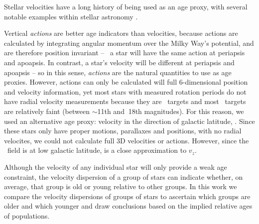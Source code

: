 Stellar velocities have a long history of being used as an age proxy, with
several notable examples within stellar astronomy \citep[\eg][]{faherty2009,
west2011}.

Vertical {\it actions} are better age indicators than velocities, because
actions are calculated by integrating angular momentum over the Milky Way's
potential, and are therefore position invariant -- \eg\ a star will have the
same action at periapsis and apoapsis.
In contrast, a star's velocity will be different at periapsis and apoapsis --
so in this sense, {\it actions} are the natural quantities to use as age
proxies.
However, actions can only be calculated will full 6-dimensional position and
velocity information, yet most stars with measured rotation periods do not
have radial velocity measurements because they are \kepler\ targets and most
\kepler\ targets are relatively faint (between $\sim$11th and $~$18th
magnitudes).
For this reason, we used an alternative age proxy: velocity in the direction
of galactic latitude, \vb.
Since these stars only have proper motions, parallaxes and positions, with no
radial velocites, we could not calculate full 3D velocities or actions.
However, since the \kepler\ field is at low galactic latitude, \vb is a close
approximation to $v_z$.

Although the velocity of any individual star will only provide a weak age
constraint, the velocity dispersion of a group of stars can indicate whether,
on average, that group is old or young relative to other groups.
In this work we compare the velocity dispersions of groups of stars to
ascertain which groups are older and which younger and draw conclusions based
on the implied relative ages of populations.

